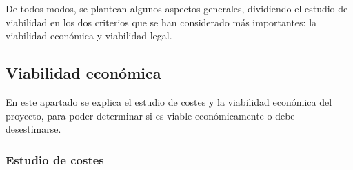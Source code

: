 De todos modos, se plantean algunos aspectos generales, dividiendo el estudio de viabilidad en los dos criterios que se han considerado más importantes: la viabilidad económica y viabilidad legal.

\subsection{Viabilidad económica}

En este apartado se explica el estudio de costes y la viabilidad económica del proyecto, para poder determinar si es viable económicamente o debe desestimarse.

\subsubsection{Estudio de costes}

